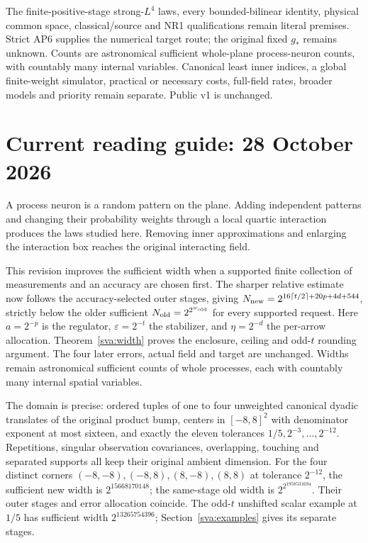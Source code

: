 \documentclass[11pt]{article}
\theoremstyle{plain}
\theoremstyle{definition}
\theoremstyle{remark}
\begin{document}
The finite-positive-stage strong-$L^4$ laws, every bounded-bilinear identity,
physical common space, classical/source and NR1 qualifications remain
literal premises. Strict AP6 supplies the numerical target route; the
original fixed $g_*$ remains unknown. Counts are astronomical sufficient
whole-plane process-neuron counts, with countably many internal variables.
Canonical least inner indices, a global finite-weight simulator, practical
or necessary costs, full-field rates, broader models and priority remain
separate. Public v1 is unchanged.
\clearpage
\clearpage
\section*{Current reading guide: 28 October 2026}
\label{sva:guide}

A process neuron is a random pattern on the plane. Adding independent
patterns and changing their probability weights through a local quartic
interaction produces the laws studied here. Removing inner approximations
and enlarging the interaction box reaches the original interacting field.

This revision improves the sufficient width when a supported finite
collection of measurements and an accuracy are chosen first. The sharper
relative estimate now follows the accuracy-selected outer stages, giving
$N_{\rm new}=2^{16\lceil t/2\rceil+20p+4d+544}$, strictly below the
older sufficient $N_{\rm old}=2^{2^{w_{\rm old}}}$ for every supported
request. Here $a=2^{-p}$ is the regulator, $\varepsilon=2^{-t}$ the
stabilizer, and $\eta=2^{-d}$ the per-arrow allocation. Theorem~\ref{sva:width}
proves the enclosure, ceiling and odd-$t$ rounding argument. The four
later errors, actual field and target are unchanged. Widths remain
astronomical sufficient counts of whole processes, each with countably
many internal spatial variables.

The domain is precise: ordered tuples of one to four unweighted canonical
dyadic translates of the original product bump, centers in $[-8,8]^2$
with denominator exponent at most sixteen, and exactly the eleven
tolerances $1/5,2^{-3},\ldots,2^{-12}$. Repetitions, singular observation
covariances, overlapping, touching and separated supports all keep their
original ambient dimension. For the four distinct corners
$(-8,-8),(-8,8),(8,-8),(8,8)$ at tolerance $2^{-12}$, the sufficient
new width is $2^{15668170148}$; the same-stage old width is
$2^{2^{1958531694}}$. Their outer stages and error allocation coincide.
The odd-$t$ unshifted scalar example at $1/5$ has sufficient width
$2^{13265754396}$; Section~\ref{sva:examples} gives its separate stages.
\end{document}
